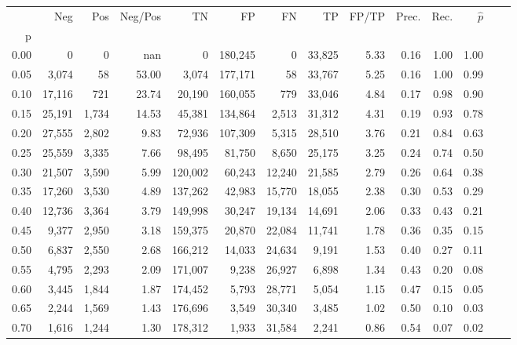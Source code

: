 \begin{tabular}{rrrrrrrrrrrrrr}
\toprule
{} &     Neg &    Pos & Neg/Pos &       TN &       FP &      FN &      TP & FP/TP & Prec. &  Rec. & $\hat{p}$ \\
p    &         &        &         &          &          &         &         &       &       &       &           \\
\midrule
0.00 &       0 &      0 &     nan &        0 &  180,245 &       0 &  33,825 &  5.33 &  0.16 &  1.00 &      1.00 \\
0.05 &   3,074 &     58 &   53.00 &    3,074 &  177,171 &      58 &  33,767 &  5.25 &  0.16 &  1.00 &      0.99 \\
0.10 &  17,116 &    721 &   23.74 &   20,190 &  160,055 &     779 &  33,046 &  4.84 &  0.17 &  0.98 &      0.90 \\
0.15 &  25,191 &  1,734 &   14.53 &   45,381 &  134,864 &   2,513 &  31,312 &  4.31 &  0.19 &  0.93 &      0.78 \\
0.20 &  27,555 &  2,802 &    9.83 &   72,936 &  107,309 &   5,315 &  28,510 &  3.76 &  0.21 &  0.84 &      0.63 \\
0.25 &  25,559 &  3,335 &    7.66 &   98,495 &   81,750 &   8,650 &  25,175 &  3.25 &  0.24 &  0.74 &      0.50 \\
0.30 &  21,507 &  3,590 &    5.99 &  120,002 &   60,243 &  12,240 &  21,585 &  2.79 &  0.26 &  0.64 &      0.38 \\
0.35 &  17,260 &  3,530 &    4.89 &  137,262 &   42,983 &  15,770 &  18,055 &  2.38 &  0.30 &  0.53 &      0.29 \\
0.40 &  12,736 &  3,364 &    3.79 &  149,998 &   30,247 &  19,134 &  14,691 &  2.06 &  0.33 &  0.43 &      0.21 \\
0.45 &   9,377 &  2,950 &    3.18 &  159,375 &   20,870 &  22,084 &  11,741 &  1.78 &  0.36 &  0.35 &      0.15 \\
0.50 &   6,837 &  2,550 &    2.68 &  166,212 &   14,033 &  24,634 &   9,191 &  1.53 &  0.40 &  0.27 &      0.11 \\
0.55 &   4,795 &  2,293 &    2.09 &  171,007 &    9,238 &  26,927 &   6,898 &  1.34 &  0.43 &  0.20 &      0.08 \\
0.60 &   3,445 &  1,844 &    1.87 &  174,452 &    5,793 &  28,771 &   5,054 &  1.15 &  0.47 &  0.15 &      0.05 \\
0.65 &   2,244 &  1,569 &    1.43 &  176,696 &    3,549 &  30,340 &   3,485 &  1.02 &  0.50 &  0.10 &      0.03 \\
0.70 &   1,616 &  1,244 &    1.30 &  178,312 &    1,933 &  31,584 &   2,241 &  0.86 &  0.54 &  0.07 &      0.02 \\

\end{tabular}
